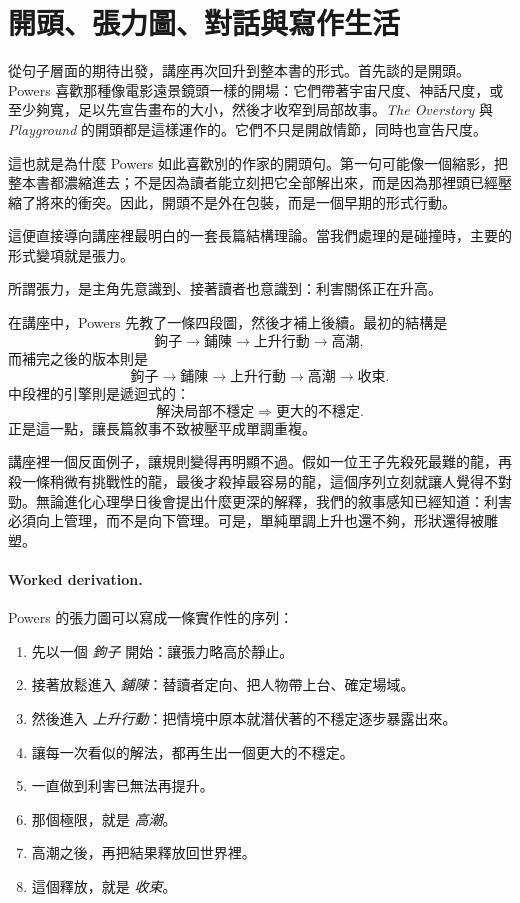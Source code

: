 \section{開頭、張力圖、對話與寫作生活}

從句子層面的期待出發，講座再次回升到整本書的形式。首先談的是開頭。Powers 喜歡那種像電影遠景鏡頭一樣的開場：它們帶著宇宙尺度、神話尺度，或至少夠寬，足以先宣告畫布的大小，然後才收窄到局部故事。\emph{The Overstory} 與 \emph{Playground} 的開頭都是這樣運作的。它們不只是開啟情節，同時也宣告尺度。

這也就是為什麼 Powers 如此喜歡別的作家的開頭句。第一句可能像一個縮影，把整本書都濃縮進去；不是因為讀者能立刻把它全部解出來，而是因為那裡頭已經壓縮了將來的衝突。因此，開頭不是外在包裝，而是一個早期的形式行動。

這便直接導向講座裡最明白的一套長篇結構理論。當我們處理的是碰撞時，主要的形式變項就是張力。

\begin{definition}
所謂張力，是主角先意識到、接著讀者也意識到：利害關係正在升高。
\end{definition}

在講座中，Powers 先教了一條四段圖，然後才補上後續。最初的結構是
\begin{equation}
\text{鉤子} \to \text{鋪陳} \to \text{上升行動} \to \text{高潮},
\end{equation}
而補完之後的版本則是
\begin{equation}
\text{鉤子} \to \text{鋪陳} \to \text{上升行動} \to \text{高潮} \to \text{收束}.
\end{equation}
中段裡的引擎則是遞迴式的：
\begin{equation}
\text{解決局部不穩定} \Rightarrow \text{更大的不穩定}.
\end{equation}
正是這一點，讓長篇敘事不致被壓平成單調重複。

講座裡一個反面例子，讓規則變得再明顯不過。假如一位王子先殺死最難的龍，再殺一條稍微有挑戰性的龍，最後才殺掉最容易的龍，這個序列立刻就讓人覺得不對勁。無論進化心理學日後會提出什麼更深的解釋，我們的敘事感知已經知道：利害必須向上管理，而不是向下管理。可是，單純單調上升也還不夠，形狀還得被雕塑。

\paragraph{Worked derivation.} Powers 的張力圖可以寫成一條實作性的序列：
\begin{enumerate}
\item 先以一個 \emph{鉤子} 開始：讓張力略高於靜止。
\item 接著放鬆進入 \emph{鋪陳}：替讀者定向、把人物帶上台、確定場域。
\item 然後進入 \emph{上升行動}：把情境中原本就潛伏著的不穩定逐步暴露出來。
\item 讓每一次看似的解法，都再生出一個更大的不穩定。
\item 一直做到利害已無法再提升。
\item 那個極限，就是 \emph{高潮}。
\item 高潮之後，再把結果釋放回世界裡。
\item 這個釋放，就是 \emph{收束}。
\end{enumerate}

